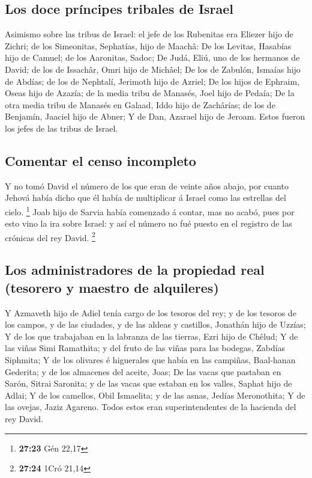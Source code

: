 \hypertarget{los-doce-pruxedncipes-tribales-de-israel}{%
\subsection{Los doce príncipes tribales de
Israel}\label{los-doce-pruxedncipes-tribales-de-israel}}

 Asimismo sobre las tribus de Israel: el jefe de los
Rubenitas era Eliezer hijo de Zichri; de los Simeonitas, Sephatías, hijo
de Maachâ:  De los Levitas, Hasabías hijo de Camuel; de
los Aaronitas, Sadoc;  De Judá, Eliú, uno de los hermanos
de David; de los de Issachâr, Omri hijo de Michâel;  De
los de Zabulón, Ismaías hijo de Abdías; de los de Nephtalí, Jerimoth
hijo de Azriel;  De los hijos de Ephraim, Oseas hijo de
Azazía; de la media tribu de Manasés, Joel hijo de Pedaía;
 De la otra media tribu de Manasés en Galaad, Iddo hijo
de Zachârías; de los de Benjamín, Jaaciel hijo de Abner; 
Y de Dan, Azarael hijo de Jeroam. Estos fueron los jefes de las tribus
de Israel.

\hypertarget{comentar-el-censo-incompleto}{%
\subsection{Comentar el censo
incompleto}\label{comentar-el-censo-incompleto}}

 Y no tomó David el número de los que eran de veinte años
abajo, por cuanto Jehová había dicho que él había de multiplicar á
Israel como las estrellas del cielo. \footnote{\textbf{27:23} Gén 22,17}
 Joab hijo de Sarvia había comenzado á contar, mas no
acabó, pues por esto vino la ira sobre Israel: y así el número no fué
puesto en el registro de las crónicas del rey David. \footnote{\textbf{27:24}
  1Cró 21,14}

\hypertarget{los-administradores-de-la-propiedad-real-tesorero-y-maestro-de-alquileres}{%
\subsection{Los administradores de la propiedad real (tesorero y maestro
de
alquileres)}\label{los-administradores-de-la-propiedad-real-tesorero-y-maestro-de-alquileres}}

 Y Azmaveth hijo de Adiel tenía cargo de los tesoros del
rey; y de los tesoros de los campos, y de las ciudades, y de las aldeas
y castillos, Jonathán hijo de Uzzías;  Y de los que
trabajaban en la labranza de las tierras, Ezri hijo de Chêlud;
 Y de las viñas Simi Ramathita; y del fruto de las viñas
para las bodegas, Zabdías Siphmita;  Y de los olivares é
higuerales que había en las campiñas, Baal-hanan Gederita; y de los
almacenes del aceite, Joas;  De las vacas que pastaban en
Sarón, Sitrai Saronita; y de las vacas que estaban en los valles, Saphat
hijo de Adlai;  Y de los camellos, Obil Ismaelita; y de
las asnas, Jedías Meronothita;  Y de las ovejas, Jaziz
Agareno. Todos estos eran superintendentes de la hacienda del rey David.

